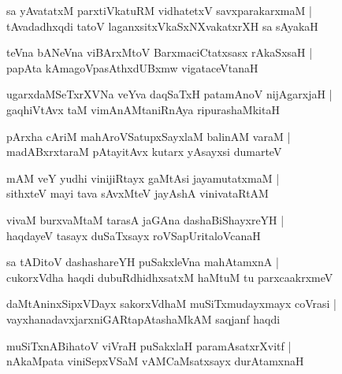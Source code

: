 \documentclass[twoside,12pt,openright]{book}
\newcounter{shloka}[chapter]
\begin{document}
\begin{shloka}%
sa yAvatatxM parxtiVkatuRM vidhatetxV savxparakarxmaM |\\
tAvadadhxqdi tatoV laganxsitxVkaSxNXvakatxrXH sa sAyakaH 
\end{shloka}

\begin{shloka}%
teVna bANeVna viBArxMtoV BarxmaciCtatxsasx rAkaSxsaH |\\
papAta kAmagoVpasAthxdUBxmw vigataceVtanaH 
\end{shloka}

\begin{shloka}%
ugarxdaMSeTxrXVNa veYva daqSaTxH patamAnoV nijAgarxjaH |\\
gaqhiVtAvx taM vimAnAMtaniRnAya ripurashaMkitaH 
\end{shloka}

\begin{shloka}%
pArxha cAriM mahAroVSatupxSayxlaM balinAM varaM |\\
madABxrxtaraM pAtayitAvx kutarx yAsayxsi dumarteV 
\end{shloka}

\begin{shloka}%
mAM veY yudhi vinijiRtayx gaMtAsi jayamutatxmaM |\\
sithxteV mayi tava sAvxMteV jayAshA vinivataRtAM 
\end{shloka}

\begin{shloka}%
vivaM burxvaMtaM tarasA jaGAna dashaBiShayxreYH |\\
haqdayeV tasayx duSaTxsayx roVSapUritaloVcanaH 
\end{shloka}

\begin{shloka}%
sa tADitoV dashashareYH puSakxleVna mahAtamxnA |\\
cukorxVdha haqdi dubuRdhidhxsatxM haMtuM  tu parxcaakrxmeV 
\end{shloka}

\begin{shloka}%
daMtAninxSipxVDayx sakorxVdhaM muSiTxmudayxmayx coVrasi |\\
vayxhanadavxjarxniGARtapAtashaMkAM saqjanf haqdi
\end{shloka}

\begin{shloka}%
muSiTxnABihatoV viVraH puSakxlaH paramAsatxrXvitf |\\
nAkaMpata viniSepxVSaM vAMCaMsatxsayx durAtamxnaH 
\end{shloka}
\end{document}

